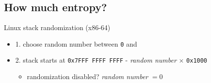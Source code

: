 \subsection{How much entropy?}

\begin{frame}{Linux stack randomization (x86-64)}
\begin{itemize}
    \item 1. choose random number between \texttt{0} and 
    \item 2. stack starts at \texttt{0x7FFF FFFF FFFF} - \textit{random number} $\times$ \texttt{0x1000}
        \begin{itemize}
        \item randomization disabled? \textit{random number} $= 0$
        \end{itemize}
\end{itemize}
\end{frame}

